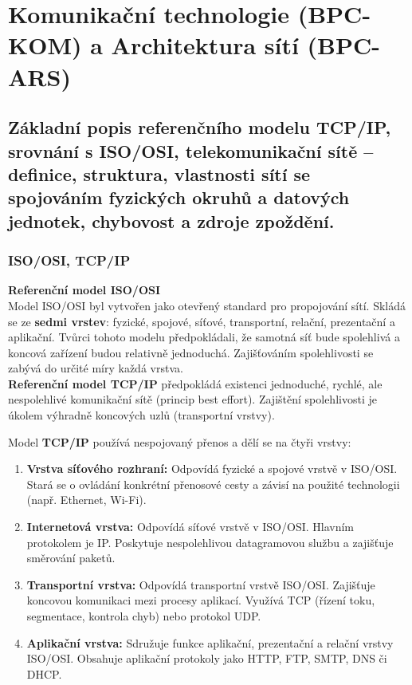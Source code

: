 \section{Komunikační technologie (BPC-KOM) a Architektura sítí (BPC-ARS)}
    \subsection{Základní popis referenčního modelu TCP/IP, srovnání s ISO/OSI, telekomunikační sítě – definice, struktura, vlastnosti sítí se spojováním fyzických okruhů a datových jednotek, chybovost a zdroje zpoždění. }

        \subsubsection{ISO/OSI, TCP/IP}
            \textbf{Referenční model ISO/OSI}\\
            Model ISO/OSI byl vytvořen jako otevřený standard pro propojování sítí. Skládá se ze \textbf{sedmi vrstev}: fyzické, spojové, síťové, transportní, relační, prezentační a aplikační. Tvůrci tohoto modelu předpokládali, že samotná síť bude spolehlivá a koncová zařízení budou relativně jednoduchá. Zajišťováním spolehlivosti se zabývá do určité míry každá vrstva.\\
            \textbf{Referenční model TCP/IP} předpokládá existenci jednoduché, rychlé, ale nespolehlivé komunikační sítě (princip best effort). Zajištění spolehlivosti je úkolem výhradně koncových uzlů (transportní vrstvy). 
            
            Model \textbf{TCP/IP} používá nespojovaný přenos a dělí se na čtyři vrstvy:
            \begin{enumerate}
                \item \textbf{Vrstva síťového rozhraní:} Odpovídá fyzické a spojové vrstvě v ISO/OSI. Stará se o ovládání konkrétní přenosové cesty a závisí na použité technologii (např. Ethernet, Wi-Fi).
                \item \textbf{Internetová vrstva:} Odpovídá síťové vrstvě v ISO/OSI. Hlavním protokolem je IP. Poskytuje nespolehlivou datagramovou službu a zajišťuje směrování paketů.
                \item \textbf{Transportní vrstva:} Odpovídá transportní vrstvě ISO/OSI. Zajišťuje koncovou komunikaci mezi procesy aplikací. Využívá TCP (řízení toku, segmentace, kontrola chyb) nebo protokol UDP.
                \item \textbf{Aplikační vrstva:} Sdružuje funkce aplikační, prezentační a relační vrstvy ISO/OSI. Obsahuje aplikační protokoly jako HTTP, FTP, SMTP, DNS či DHCP.
            \end{enumerate}
